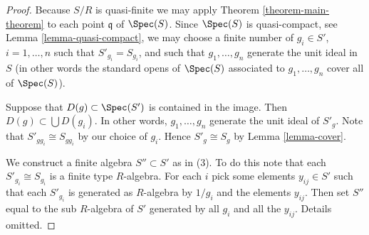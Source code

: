 \begin{proof}
Because $S/R$ is quasi-finite we may apply
Theorem \ref{theorem-main-theorem} to
each point $\mathfrak q$ of $\Spec(S)$.
Since $\Spec(S)$ is quasi-compact, see
Lemma \ref{lemma-quasi-compact}, we may choose
a finite number of $g_i \in S'$, $i = 1, \ldots, n$
such that $S'_{g_i} = S_{g_i}$, and such that
$g_1, \ldots, g_n$ generate the unit ideal in $S$
(in other words the standard opens of $\Spec(S)$ associated
to $g_1, \ldots, g_n$ cover all of $\Spec(S)$).

\medskip\noindent
Suppose that $D(g) \subset \Spec(S')$
is contained in the image. Then $D(g) \subset \bigcup D(g_i)$.
In other words, $g_1, \ldots, g_n$ generate the unit ideal of
$S'_g$. Note that $S'_{gg_i} \cong S_{gg_i}$ by our choice
of $g_i$. Hence $S'_g \cong S_g$ by Lemma \ref{lemma-cover}.

\medskip\noindent
We construct a finite algebra $S'' \subset S'$ as
in (3). To do this note that each $S'_{g_i} \cong S_{g_i}$
is a finite type $R$-algebra. For each $i$ pick
some elements $y_{ij} \in S'$ such that each
$S'_{g_i}$ is generated as $R$-algebra by $1/g_i$
and the elements $y_{ij}$. Then set $S''$
equal to the sub $R$-algebra of $S'$ generated by all $g_i$
and all the $y_{ij}$. Details omitted.
\end{proof}




